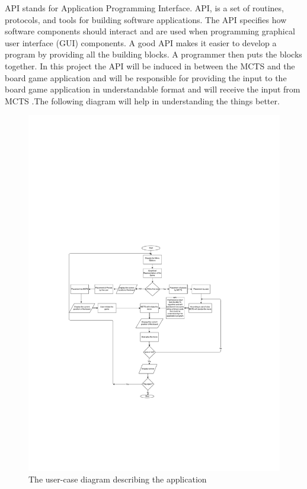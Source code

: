 API stands for Application Programming Interface. API, is a set of routines, protocols, and tools for building software applications. The API specifies how software components should interact and are used when programming graphical user interface (GUI) components. A good API makes it easier to develop a program by providing all the building blocks. A programmer then puts the blocks together.\bigbreak
 In this project the API will be induced in between the MCTS and the board game application and will be responsible for providing the input to the board game application in understandable format and will receive the input from MCTS .The following diagram will help in understanding the things better.

\bigbreak

\begin{figure}[!h]
\centering
\includegraphics[width=1.7\textwidth]{2General_Architecture/2.2API/flow.pdf}
\caption{The user-case diagram describing the application}
\label{fig:pieces}
\end{figure}


